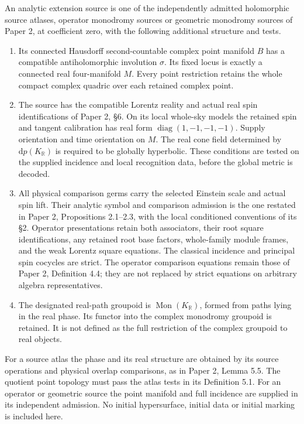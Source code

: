 \documentclass[
  english,
  11pt,
  reqno]{amsart}
\providecommand{\tightlist}{%
  \setlength{\itemsep}{0pt}\setlength{\parskip}{0pt}}
\begin{document}
An analytic extension source is one of the independently admitted
holomorphic source atlases, operator monodromy sources or geometric
monodromy sources of Paper 2, at coefficient zero, with the following
additional structure and tests.

\begin{enumerate}
\tightlist
\item
  Its connected Hausdorff second-countable complex point manifold \(B\)
  has a compatible antiholomorphic involution \(\sigma\). Its fixed
  locus is exactly a connected real four-manifold \(M\). Every point
  restriction retains the whole compact complex quadric over each
  retained complex point.
\item
  The source has the compatible Lorentz reality and actual real spin
  identifications of Paper 2, §6. On its local whole-sky models the
  retained spin and tangent calibration has real form
  \(\operatorname{diag}(1,-1,-1,-1)\). Supply orientation and time
  orientation on \(M\). The real cone field determined by
  \(\mathrm dp(K_{\mathbb R})\) is required to be globally hyperbolic.
  These conditions are tested on the supplied incidence and local
  recognition data, before the global metric is decoded.
\item
  All physical comparison germs carry the selected Einstein scale and
  actual spin lift. Their analytic symbol and comparison admission is
  the one restated in Paper 2, Propositions 2.1--2.3, with the local
  conditioned conventions of its §2. Operator presentations retain both
  associators, their root square identifications, any retained root base
  factors, whole-family module frames, and the weak Lorentz square
  equations. The classical incidence and principal spin cocycles are
  strict. The operator comparison equations remain those of Paper 2,
  Definition 4.4; they are not replaced by strict equations on arbitrary
  algebra representatives.
\item
  The designated real-path groupoid is
  \(\operatorname{Mon}(K_{\mathbb R})\), formed from paths lying in the
  real phase. Its functor into the complex monodromy groupoid is
  retained. It is not defined as the full restriction of the complex
  groupoid to real objects.
\end{enumerate}

For a source atlas the phase and its real structure are obtained by its
source operations and physical overlap comparisons, as in Paper 2, Lemma
5.5. The quotient point topology must pass the atlas tests in its
Definition 5.1. For an operator or geometric source the point manifold
and full incidence are supplied in its independent admission. No initial
hypersurface, initial data or initial marking is included here.
\end{document}
